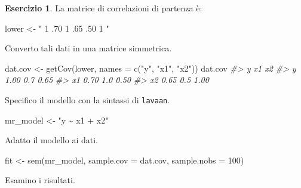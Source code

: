 \documentclass[
  11pt,
]{krantz}
\makeatletter
\newenvironment{Shaded}{\begin{snugshade}}{\end{snugshade}}
\newcommand{\AttributeTok}[1]{\textcolor[rgb]{0.61,0.61,0.61}{#1}}
\newcommand{\CommentTok}[1]{\textcolor[rgb]{0.37,0.37,0.37}{\textit{#1}}}
\newcommand{\DecValTok}[1]{\textcolor[rgb]{0.06,0.06,0.06}{#1}}
\newcommand{\FunctionTok}[1]{\textcolor[rgb]{0,0,0}{#1}}
\newcommand{\NormalTok}[1]{#1}
\newcommand{\OtherTok}[1]{\textcolor[rgb]{0.37,0.37,0.37}{#1}}
\newcommand{\StringTok}[1]{\textcolor[rgb]{0.5,0.5,0.5}{#1}}
\newenvironment{kframe}{%
\medskip{}
\setlength{\fboxsep}{.8em}
 \def\at@end@of@kframe{}%
 \ifinner\ifhmode%
  \def\at@end@of@kframe{\end{minipage}}%
  \begin{minipage}{\columnwidth}%
 \fi\fi%
 \def\FrameCommand##1{\hskip\@totalleftmargin \hskip-\fboxsep
 \colorbox{shadecolor}{##1}\hskip-\fboxsep
     \hskip-\linewidth \hskip-\@totalleftmargin \hskip\columnwidth}%
 \MakeFramed {\advance\hsize-\width
   \@totalleftmargin\z@ \linewidth\hsize
   \@setminipage}}%
 {\par\unskip\endMakeFramed%
 \at@end@of@kframe}
\renewenvironment{Shaded}{\begin{kframe}}{\end{kframe}}
\theoremstyle{definition}
\theoremstyle{definition}
\theoremstyle{definition}
\newtheorem{exercise}{Esercizio}[chapter]
\theoremstyle{definition}
\theoremstyle{remark}
\makeatother
\begin{document}
\begin{exercise}
La matrice di correlazioni di partenza è:

\begin{Shaded}
\begin{Highlighting}[]
\NormalTok{lower }\OtherTok{\textless{}{-}} \StringTok{"}
\StringTok{  1}
\StringTok{  .70 1}
\StringTok{  .65 .50 1}
\StringTok{"}
\end{Highlighting}
\end{Shaded}

Converto tali dati in una matrice simmetrica.

\begin{Shaded}
\begin{Highlighting}[]
\NormalTok{dat.cov }\OtherTok{\textless{}{-}} \FunctionTok{getCov}\NormalTok{(lower, }\AttributeTok{names =} \FunctionTok{c}\NormalTok{(}\StringTok{"y"}\NormalTok{, }\StringTok{"x1"}\NormalTok{, }\StringTok{"x2"}\NormalTok{))}
\NormalTok{dat.cov}
\CommentTok{\#\textgreater{}       y  x1   x2}
\CommentTok{\#\textgreater{} y  1.00 0.7 0.65}
\CommentTok{\#\textgreater{} x1 0.70 1.0 0.50}
\CommentTok{\#\textgreater{} x2 0.65 0.5 1.00}
\end{Highlighting}
\end{Shaded}

Specifico il modello con la sintassi di \texttt{lavaan}.

\begin{Shaded}
\begin{Highlighting}[]
\NormalTok{mr\_model }\OtherTok{\textless{}{-}} \StringTok{"y \textasciitilde{} x1 + x2"}
\end{Highlighting}
\end{Shaded}

Adatto il modello ai dati.

\begin{Shaded}
\begin{Highlighting}[]
\NormalTok{fit }\OtherTok{\textless{}{-}} \FunctionTok{sem}\NormalTok{(mr\_model, }\AttributeTok{sample.cov =}\NormalTok{ dat.cov, }\AttributeTok{sample.nobs =} \DecValTok{100}\NormalTok{)}
\end{Highlighting}
\end{Shaded}

Esamino i risultati.


\end{exercise}
\end{document}
